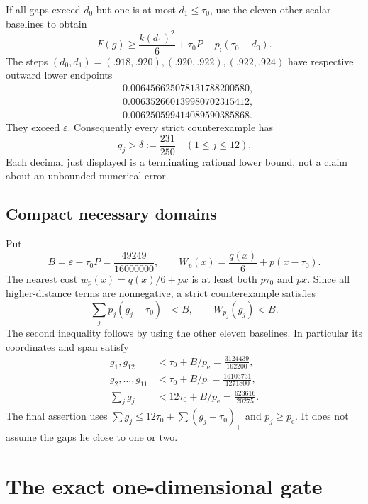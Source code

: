 \documentclass[11pt]{amsart}
\numberwithin{equation}{section}
\newcommand{\eps}{\varepsilon}
\newcommand{\pe}{p_{\mathrm e}}
\newcommand{\pint}{p_{\mathrm i}}
\begin{document}
If all gaps exceed $d_0$ but one is at most $d_1\leq\tau_0$,
use the eleven other scalar baselines to obtain
\begin{equation}\label{eq:bootstrap2}
 F(g)\geq\frac{k(d_1)^2}{6}+\tau_0P-\pint(\tau_0-d_0).
\end{equation}
The steps $(d_0,d_1)=(.918,.920),(.920,.922),(.922,.924)$
have respective outward lower endpoints
\begin{align*}
 &0.006456625078131788200580,\\
 &0.006352660139980702315412,\\
 &0.006250599414089590385868.
\end{align*}
They exceed $\eps$. Consequently every strict counterexample has
\begin{equation}\label{eq:delta}
 g_j>\delta:=\frac{231}{250}\quad(1\leq j\leq12).
\end{equation}
Each decimal just displayed is a terminating rational lower bound,
not a claim about an unbounded numerical error.

\subsection{Compact necessary domains}

Put
\begin{equation}\label{eq:gateB}
 B=\eps-\tau_0P=\frac{49249}{16000000},\qquad
 W_p(x)=\frac{q(x)}6+p(x-\tau_0).
\end{equation}
The nearest cost $w_p(x)=q(x)/6+px$ is at least both $p\tau_0$
and $px$. Since all higher-distance terms are nonnegative, a strict
counterexample satisfies
\begin{equation}\label{eq:positiveparts0}
 \sum_jp_j(g_j-\tau_0)_+<B,
 \qquad W_{p_j}(g_j)<B.
\end{equation}
The second inequality follows by using the other eleven baselines.
In particular its coordinates and span satisfy
\begin{align}
 g_1,g_{12}&<\tau_0+B/\pe=\frac{3124439}{162200},\nonumber\\
 g_2,\ldots,g_{11}&<\tau_0+B/\pint=\frac{16103731}{1271800},
       \label{eq:globalcaps}\\
 \sum_jg_j&<12\tau_0+B/\pe=\frac{623616}{20275}.
       \nonumber
\end{align}
The final assertion uses
$\sum g_j\leq12\tau_0+\sum(g_j-\tau_0)_+$ and
$p_j\geq\pe$. It does not assume the gaps lie close to one or two.

\section{The exact one-dimensional gate}
\end{document}
